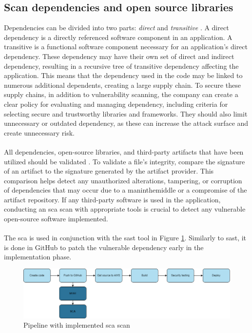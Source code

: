 \subsection{Scan dependencies and open source libraries}
\label{Scan Dependencies and Open Source Libraries}
Dependencies can be divided into two parts: \textit{direct} and \textit{transitive} \cite{googledependency}. A direct dependency is a directly referenced software component in an application. A transitive is a functional software component necessary for an application's direct \gls{dependency}. These \gls{dependency} may have their own set of direct and indirect \gls{dependency}, resulting in a recursive tree of transitive \gls{dependency} affecting the application. This means that the \gls{dependency} used in the code may be linked to numerous additional dependents, creating a large supply chain. To secure these supply chains, in addition to vulnerability scanning, the company can create a clear policy for evaluating and managing \gls{dependency}, including criteria for selecting secure and trustworthy libraries and frameworks. They should also limit unnecessary or outdated \gls{dependency}, as these can increase the attack surface and create unnecessary risk. 
\\~\\
All dependencies, open-source libraries, and third-party \gls{artifact}s that have been utilized should be validated \cite{bestpracticeSupplyChain}. To validate a file's integrity, compare the signature of an artifact to the signature generated by the artifact provider. This comparison helps detect any unauthorized alterations, tampering, or corruption of dependencies that may occur due to a \gls{maninthemiddle} or a compromise of the artifact repository. If any third-party software is used in the application, conducting an \acrshort{sca} scan with appropriate tools is crucial to detect any vulnerable open-source software implemented. 
\\~\\
The \acrshort{sca}  is used in conjunction with the \acrshort{sast} tool in Figure \ref{fig: Pipeline with implemented SCA scan}. Similarly to \acrshort{sast}, it is done in GitHub to patch the vulnerable \gls{dependency} early in the implementation phase. \cite{scaplasment}

\vspace{2mm}
\begin{figure}[H]
    \centering
    \includegraphics[width=0.8\columnwidth]{Images/pipeline3.png}
    \caption{Pipeline with implemented \acrshort{sca} scan}
    \label{fig: Pipeline with implemented SCA scan}
\end{figure}


